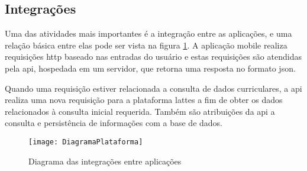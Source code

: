 \subsection{Integrações}\label{subsec:integrar}

Uma das atividades mais importantes é a integração entre as aplicações, e uma relação básica entre elas pode ser vista na figura \ref{fig:diagrama}. A aplicação mobile realiza requisições \gls{http} baseado nas entradas do usuário e estas requisições são atendidas pela \gls{api}, hospedada em um servidor, que retorna uma resposta no formato \gls{json}.

Quando uma requisição estiver relacionada a consulta de dados curriculares, a \gls{api} realiza uma nova requisição para a plataforma lattes a fim de obter os dados relacionados à consulta inicial requerida. Também são atribuições da \gls{api} a consulta e persistência de informações com a base de dados.

\begin{figure}[htb]
    \caption{Diagrama das integrações entre aplicações}
    \texttt{[image: DiagramaPlataforma]}
    \label{fig:diagrama}
\end{figure}